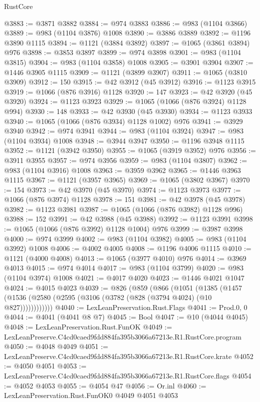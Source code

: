 \begin{lexlean}{RustCore}
\begin{coremodule}
@3883 := @3871 @3882
@3884 := @974 @3883
@3886 := @983 (@1104 @3866)
@3889 := @983 (@1104 @3876) @1008
@3890 := @3886 @3889
@3892 := @1196 @3890 @1115
@3894 := @1121 (@3884 @3892)
@3897 := @1065 (@3861 @3894) @976
@3898 := @3853 @3897
@3899 := @974 @3898
@3901 := @983 (@1104 @3815)
@3904 := @983 (@1104 @3858) @1008
@3905 := @3901 @3904
@3907 := @1446 @3905 @1115
@3909 := @1121 (@3899 @3907)
@3911 := @1065 (@3810 @3909)
@3912 := 150
@3915 := @42 @3912 (@45 @3912)
@3916 := @1123 @3915
@3919 := @1066 (@876 @3916) @1128
@3920 := 147
@3923 := @42 @3920 (@45 @3920)
@3924 := @1123 @3923
@3929 := @1065 (@1066 (@876 @3924) @1128 @994)
@3930 := 148
@3933 := @42 @3930 (@45 @3930)
@3934 := @1123 @3933
@3940 := @1065 (@1066 (@876 @3934) @1128 @1002) @976
@3941 := @3929 @3940
@3942 := @974 @3941
@3944 := @983 (@1104 @3924)
@3947 := @983 (@1104 @3934) @1008
@3948 := @3944 @3947
@3950 := @1196 @3948 @1115
@3952 := @1121 (@3942 @3950)
@3955 := @1065 (@3919 @3952) @976
@3956 := @3911 @3955
@3957 := @974 @3956
@3959 := @983 (@1104 @3807)
@3962 := @983 (@1104 @3916) @1008
@3963 := @3959 @3962
@3965 := @1446 @3963 @1115
@3967 := @1121 (@3957 @3965)
@3969 := @1065 (@3802 @3967)
@3970 := 154
@3973 := @42 @3970 (@45 @3970)
@3974 := @1123 @3973
@3977 := @1066 (@876 @3974) @1128
@3978 := 151
@3981 := @42 @3978 (@45 @3978)
@3982 := @1123 @3981
@3987 := @1065 (@1066 (@876 @3982) @1128 @996)
@3988 := 152
@3991 := @42 @3988 (@45 @3988)
@3992 := @1123 @3991
@3998 := @1065 (@1066 (@876 @3992) @1128 @1004) @976
@3999 := @3987 @3998
@4000 := @974 @3999
@4002 := @983 (@1104 @3982)
@4005 := @983 (@1104 @3992) @1008
@4006 := @4002 @4005
@4008 := @1196 @4006 @1115
@4010 := @1121 (@4000 @4008)
@4013 := @1065 (@3977 @4010) @976
@4014 := @3969 @4013
@4015 := @974 @4014
@4017 := @983 (@1104 @3799)
@4020 := @983 (@1104 @3974) @1008
@4021 := @4017 @4020
@4023 := @1446 @4021 @1047
@4024 := @4015 @4023
@4039 := @826
    (@859
      (@866
        (@1051
          (@1385 (@1457 (@1536 (@2580 (@2595 (@3106 (@3782 (@828 (@3794 @4024) (@10 @827))))))))))))
@4040 := LexLeanPreservation.Rust.Flags
@4041 := Prod.{0, 0}
@4044 := @4041 (@4041 @8 @7)
@4045 := Bool
@4047 := @10 (@4044 @4045)
@4048 := LexLeanPreservation.Rust.FunOK
@4049 := LexLeanPreserve.C4cd0caed9fdd884fa395b3066a67213e.R1.RustCore.program
@4050 := @4048 @4049
@4051 := LexLeanPreserve.C4cd0caed9fdd884fa395b3066a67213e.R1.RustCore.krate
@4052 := @4050 @4051
@4053 := LexLeanPreserve.C4cd0caed9fdd884fa395b3066a67213e.R1.RustCore.flags
@4054 := @4052 @4053
@4055 := @4054 @47
@4056 := Or.inl
@4060 := LexLeanPreservation.Rust.FunOK0 @4049 @4051 @4053

\end{coremodule}
\end{lexlean}
